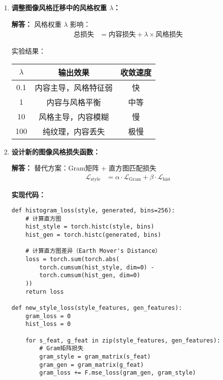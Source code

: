 \documentclass[a4paper,12pt]{book}
\begin{document}
\begin{enumerate}[label=\arabic*.]
    \item \textbf{调整图像风格迁移中的风格权重 $\lambda$：}
    
    \textbf{解答：} 风格权重 $\lambda$ 影响：
    \begin{align*}
    \text{总损失} &= \text{内容损失} + \lambda \times \text{风格损失}
    \end{align*}
    
    实验结果：
    \begin{table}[h]
        \centering
        \begin{tabular}{|c|c|c|}
            \hline
            $\lambda$ & \textbf{输出效果} & \textbf{收敛速度} \\
            \hline
            0.1 & 内容主导，风格特征弱 & 快 \\
            1 & 内容与风格平衡 & 中等 \\
            10 & 风格主导，内容模糊 & 慢 \\
            100 & 纯纹理，内容丢失 & 极慢 \\
            \hline
        \end{tabular}
    \end{table}
    
    \item \textbf{设计新的图像风格损失函数：}
    
    \textbf{解答：} 替代方案：Gram矩阵 + 直方图匹配损失
    \begin{align*}
    \mathcal{L}_{\text{style}} &= \alpha \cdot \mathcal{L}_{\text{Gram}} + \beta \cdot \mathcal{L}_{\text{hist}}
    \end{align*}
    
    \textbf{实现代码：}
    \begin{verbatim}
def histogram_loss(style, generated, bins=256):
    # 计算直方图
    hist_style = torch.histc(style, bins)
    hist_gen = torch.histc(generated, bins)
    
    # 计算直方图差异（Earth Mover's Distance）
    loss = torch.sum(torch.abs(
        torch.cumsum(hist_style, dim=0) - 
        torch.cumsum(hist_gen, dim=0)
    ))
    return loss

def new_style_loss(style_features, gen_features):
    gram_loss = 0
    hist_loss = 0
    
    for s_feat, g_feat in zip(style_features, gen_features):
        # Gram矩阵损失
        gram_style = gram_matrix(s_feat)
        gram_gen = gram_matrix(g_feat)
        gram_loss += F.mse_loss(gram_gen, gram_style)
        

\end{verbatim}
\end{enumerate}
\end{document}
